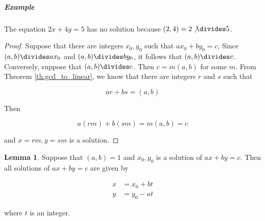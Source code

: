 \documentclass{article}
\theoremstyle{definition} %
\theoremstyle{definition}
\theoremstyle{definition}
\newtheorem{lemma}{Lemma}[section]
\theoremstyle{definition}
\begin{document}
  \subparagraph{Example} The equation $2x + 4y = 5$ has no solution because $(2, 4) = 2 \not\divides 5$.
  
  \begin{proof}
    Suppose that there are integers $x_0, y_0$ such that $ax_0 + by_0 = c$, Since $(a, b) \divides ax_0$ and
    $(a, b) \divides by_0$, it follows that $(a, b) \divides c$. Conversely, suppose that $(a, b) \divides c$.
    Then $c = m(a, b)$ for some $m$. From Theorem \ref{th:gcd_to_linear}, we know that there are integers $r$ and $s$ such that
    
    \begin{equation*}
      ar + bs = (a, b)
    \end{equation*}
    
    Then
    
    \begin{equation*}
      a(rm) + b(sm) = m(a, b) = c
    \end{equation*}
    
    and $x = rm, y = sm$ is a solution.
  \end{proof}
  
  \begin{lemma}
    Suppose that $(a, b) = 1$ and $x_0, y_0$ is a solution of $ax + by = c$. Then all solutions of $ax + by = c$ are
    given by
    
    \begin{align*}
      x &= x_0 + bt \\
      y &= y_0 - at
    \end{align*}
    
    where $t$ is an integer.
  \end{lemma}
  
\end{document}
